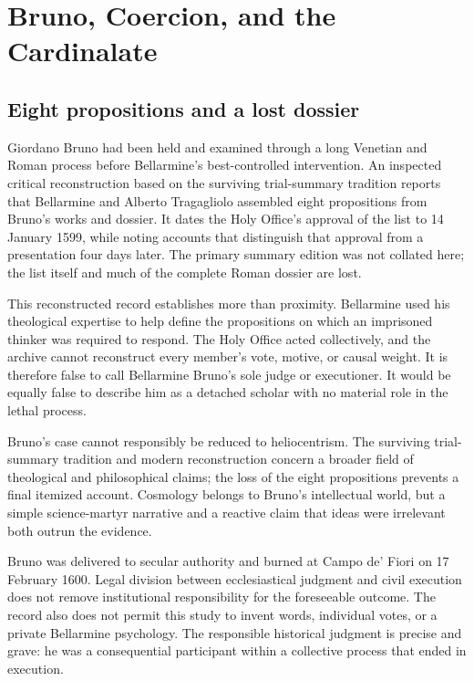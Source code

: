 \section{Bruno, Coercion, and the Cardinalate}

\subsection{Eight propositions and a lost dossier}

Giordano Bruno had been held and examined through a long Venetian and Roman
process before Bellarmine's best-controlled intervention.  An inspected
critical reconstruction based on the surviving trial-summary tradition
reports that Bellarmine and Alberto Tragagliolo assembled eight propositions
from Bruno's works and dossier.  It dates the Holy Office's approval of the
list to 14 January 1599, while noting accounts that distinguish that approval
from a presentation four days later.  The primary summary edition was not
collated here; the list itself and much of the complete Roman dossier are lost.

This reconstructed record establishes more than proximity.  Bellarmine used his
theological expertise to help define the propositions on which an imprisoned
thinker was required to respond.  The Holy Office acted collectively, and the
archive cannot reconstruct every member's vote, motive, or causal weight.  It
is therefore false to call Bellarmine Bruno's sole judge or executioner.  It
would be equally false to describe him as a detached scholar with no material
role in the lethal process.

Bruno's case cannot responsibly be reduced to heliocentrism.  The surviving
trial-summary tradition and modern reconstruction concern a broader field of
theological and philosophical claims; the loss of the eight propositions
prevents a final itemized account.  Cosmology belongs to Bruno's intellectual
world, but a simple science-martyr narrative and a reactive claim that ideas
were irrelevant both outrun the evidence.

Bruno was delivered to secular authority and burned at Campo de' Fiori on 17
February 1600.  Legal division between ecclesiastical judgment and civil
execution does not remove institutional responsibility for the foreseeable
outcome.  The record also does not permit this study to invent words,
individual votes, or a private Bellarmine psychology.  The responsible
historical judgment is precise and grave: he was a consequential participant
within a collective process that ended in execution.

